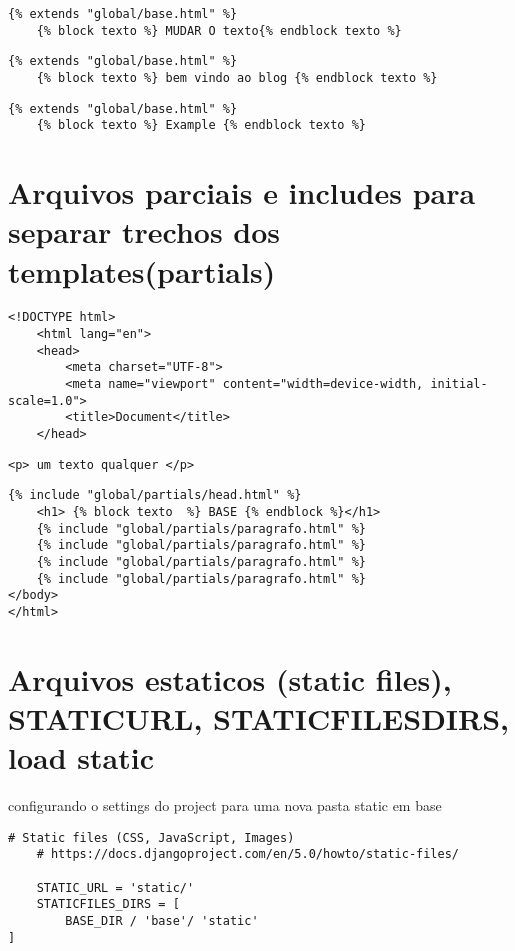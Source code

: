 \documentclass{article}
\begin{document}
\begin{lstlisting}[style=djangohtml, caption={home/templates/home.html}]
    {% extends "global/base.html" %}
    {% block texto %} MUDAR O texto{% endblock texto %}
\end{lstlisting}


\begin{lstlisting}[style=djangohtml, caption={blog/templates/blog.html}]
    {% extends "global/base.html" %}
    {% block texto %} bem vindo ao blog {% endblock texto %}
\end{lstlisting}


\begin{lstlisting}[style=djangohtml, caption={blog/templates/example.html}]
    {% extends "global/base.html" %}
    {% block texto %} Example {% endblock texto %}
\end{lstlisting}
\section{Arquivos parciais e includes para separar trechos dos templates(partials)}
\textbf{}
\begin{lstlisting}[style=djangohtml, caption={base/global/partials/head.html}]
        <!DOCTYPE html>
    <html lang="en">
    <head>
        <meta charset="UTF-8">
        <meta name="viewport" content="width=device-width, initial-scale=1.0">
        <title>Document</title>
    </head>
\end{lstlisting}
\begin{lstlisting}[style=djangohtml, caption={base/global/partials/paragrafo.html}]
    <p> um texto qualquer </p>
\end{lstlisting}


\begin{lstlisting}[style=djangohtml, caption={base/global/base.html}]
    {% include "global/partials/head.html" %}
    <h1> {% block texto  %} BASE {% endblock %}</h1>
    {% include "global/partials/paragrafo.html" %}
    {% include "global/partials/paragrafo.html" %}
    {% include "global/partials/paragrafo.html" %}
    {% include "global/partials/paragrafo.html" %}
</body>
</html>
\end{lstlisting}

\section{Arquivos estaticos (static files), STATICURL, STATICFILESDIRS,  load static}
configurando o settings do project para uma nova pasta static em base
\begin{lstlisting}[style=pythonStyle, caption={project/settings.py}]
    # Static files (CSS, JavaScript, Images)
    # https://docs.djangoproject.com/en/5.0/howto/static-files/

    STATIC_URL = 'static/'
    STATICFILES_DIRS = [
        BASE_DIR / 'base'/ 'static'
]
\end{lstlisting}
\end{document}
